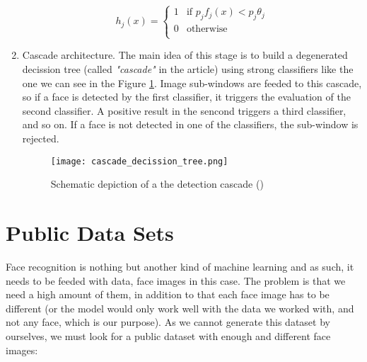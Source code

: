\begin{enumerate}
		\begin{equation}
			\label{eq:viola_jones_weak_classifier}
			h_j(x)=
				\begin{cases}
			     	1 & \text{if $p_jf_j(x) < p_j\theta_j$} \\
			        0 & \text{otherwise} \\
				\end{cases}
		\end{equation}

		\item Cascade architecture. The main idea of this stage is to build a degenerated decission tree (called \textit{"cascade"} in the article) using strong classifiers like the one we can see in the Figure \ref{fig:cascade_decission_tree}. Image sub-windows are feeded to this cascade, so if a face is detected by the first classifier, it triggers the evaluation of the second classifier. A positive result in the sencond triggers a third classifier, and so on. If a face is not detected in one of the classifiers, the sub-window is rejected. 
		
		\begin{figure}[!ht]
			\centering
			\texttt{[image: cascade\_decission\_tree.png]}
			\caption{Schematic depiction of a the detection cascade (\cite{viola2001rapid})}
			\label{fig:cascade_decission_tree}
		\end{figure}
			
	\end{enumerate}

\section{Public Data Sets} 
Face recognition is nothing but another kind of machine learning and as such, it needs to be feeded with data, face images in this case. The problem is that we need a high amount of them, in addition to that each face image has to be different (or the model would only work well with the data we worked with, and not any face, which is our purpose). As we cannot generate this dataset by ourselves, we must look for a public dataset with enough and different face images:

